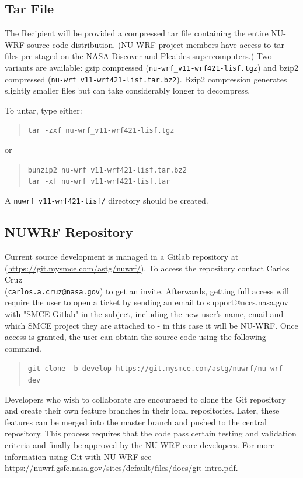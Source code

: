 \subsection{Tar File}

The Recipient will be provided a compressed tar file containing the entire
NU-WRF source code distribution. (NU-WRF project members have access to tar 
files pre-staged on the NASA Discover and Pleaides supercomputers.)
Two variants are available: gzip compressed
(\texttt{nu-wrf\_v11-wrf421-lisf.tgz}) and bzip2 compressed
(\texttt{nu-wrf\_v11-wrf421-lisf.tar.bz2}). Bzip2 compression generates
slightly smaller files but can take considerably longer to decompress.

To untar, type either:
\begin{quote} 
  \texttt{tar -zxf nu-wrf\_v11-wrf421-lisf.tgz}
\end{quote}

or

\begin{quote}
  \texttt{bunzip2 nu-wrf\_v11-wrf421-lisf.tar.bz2}\\
  \texttt{tar -xf nu-wrf\_v11-wrf421-lisf.tar}
\end{quote}

A \texttt{nuwrf\_v11-wrf421-lisf/} directory should be created.

\subsection{NUWRF Repository}

Current source development is managed in a Gitlab repository at
(\url{https://git.mysmce.com/astg/nuwrf/}). To access the repository contact  Carlos Cruz\\
(\href{mailto:carlos.a.cruz@nasa.gov}{\texttt{carlos.a.cruz@nasa.gov}}) to get an invite. Afterwards, getting full access will require the user to open a ticket by sending an email to support@nccs.nasa.gov with "SMCE Gitlab" in the subject, including the new user's name, email and which SMCE project they are attached to - in this case it will be NU-WRF. Once access is granted, the user can obtain the source code using the following command. 

\begin{quote}
\texttt{git clone -b develop https://git.mysmce.com/astg/nuwrf/nu-wrf-dev}
\end{quote}

Developers who wish to collaborate are encouraged to clone the Git repository and create their own 
feature branches in their local repositories. Later, these features can be merged into the master branch and pushed to the central repository. This process requires that the code pass certain testing and validation criteria and finally be approved by the  NU-WRF core developers. For more information using Git with NU-WRF see \url{https://nuwrf.gsfc.nasa.gov/sites/default/files/docs/git-intro.pdf}.
\hfill \break
\mbox{}\\


